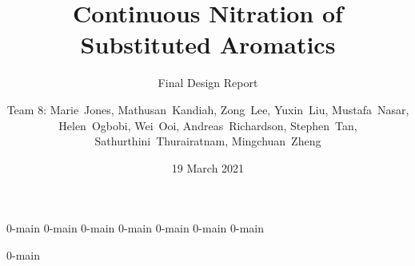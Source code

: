 \documentclass{nitroma-report}
\subtitle{Final Design Report}
\title{Continuous Nitration of Substituted Aromatics}
\author{Team 8: Marie~Jones, Mathusan~Kandiah, Zong~Lee, Yuxin~Liu, Mustafa~Nasar, Helen~Ogbobi, Wei~Ooi, Andreas~Richardson, Stephen~Tan, Sathurthini~Thurairatnam, Mingchuan~Zheng}
\date{19 March 2021}
\begin{document}
\frontmatter
\maketitle



\setcounter{tocdepth}{1}
\tableofcontents

\mainmatter
{0-main}
{0-main}
{0-main}
{0-main}
{0-main}
{0-main}
{0-main}

\begin{appendices}
    {0-main}
\end{appendices}
\end{document}
